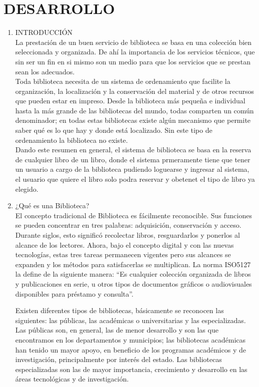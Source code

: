 \section{DESARROLLO} 

\begin{enumerate}[1.]
	\item INTRODUCCIÓN 
	\\ La prestación de un buen servicio de biblioteca se basa en una colección bien seleccionada y organizada. De ahí la importancia de los servicios técnicos, que sin ser un fin en si mismo son un medio para que los servicios que se prestan sean los adecuados.
	\\ Toda biblioteca necesita de un sistema de ordenamiento que facilite la organización, la localización y la conservación del material y de otros recursos que pueden estar en impreso. Desde la biblioteca más pequeña e individual hasta la más grande de las bibliotecas del mundo, todas comparten un común denominador; en todas estas bibliotecas existe algún mecanismo que permite saber qué es lo que hay y donde está localizado. Sin este tipo de ordenamiento la biblioteca no existe.
	\\ Dando este resumen en general, el sistema de biblioteca se basa en la reserva de cualquier libro de un libro, donde el sistema prmeramente tiene que tener un usuario a cargo de la biblioteca pudiendo loguearse y ingresar al sistema, el usuario que quiere el libro solo podra reservar y obetenet el tipo de libro ya elegido. 

\item ¿Qué es una Biblioteca? \\
El concepto tradicional de Biblioteca es fácilmente reconocible. Sus funciones se pueden concentrar en tres palabras: adquisición, conservación y acceso. Durante siglos, esto significó recolectar libros, resguardarlos y ponerlos al alcance de los lectores. Ahora, bajo el concepto digital y con las nuevas tecnologías, estas tres tareas permanecen vigentes pero sus alcances se expanden y los métodos para satisfacerlas se multiplican. La norma ISO5127 la define de la siguiente manera:
“Es cualquier colección organizada de libros y publicaciones en serie, u otros tipos de documentos gráficos o audiovisuales disponibles para préstamo y consulta”.

Existen diferentes tipos de bibliotecas, básicamente se reconocen las siguientes: las públicas, las académicas o universitarias y las especializadas. Las públicas son, en general, las de menor desarrollo y son las que encontramos en los departamentos y municipios; las bibliotecas académicas han tenido un mayor apoyo, en beneficio de los programas académicos y de investigación, principalmente por interés del estado. Las bibliotecas especializadas son las de mayor importancia, crecimiento y desarrollo en las áreas tecnológicas y de investigación.
    


\end{enumerate} 
